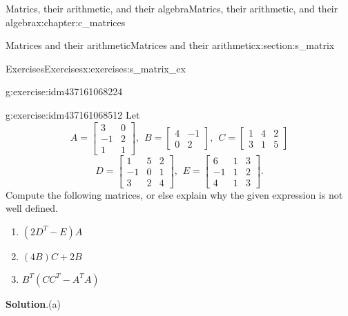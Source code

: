 \documentclass[oneside,10pt,]{book}
\newcommand{\blocktitlefont}{\relax}
\numberwithin{equation}{section}
\newcommand{\amp}{&}
\begin{document}
\begin{chapterptx}{Matrics, their arithmetic, and their algebra}{}{Matrics, their arithmetic, and their algebra}{}{}{x:chapter:c_matrices}
\begin{sectionptx}{Matrices and their arithmetic}{}{Matrices and their arithmetic}{}{}{x:section:s_matrix}
\begin{exercises-subsection-numberless}{Exercises}{}{Exercises}{}{}{x:exercises:s_matrix_ex}
\begin{divisionexercise}{1}{}{}{g:exercise:idm437161068224}
\end{divisionexercise}%
\begin{divisionexercise}{2}{}{}{g:exercise:idm437161068512}%
Let%
\begin{equation*}
A = \begin{bmatrix}3\amp 0\\ -1\amp 2\\ 1\amp 1 \end{bmatrix} , \hspace{5pt} B = \begin{bmatrix}4\amp -1\\ 0\amp 2 \end{bmatrix} , \hspace{5pt} C = \begin{bmatrix}1\amp 4\amp 2\\ 3\amp 1\amp 5 \end{bmatrix}
\end{equation*}
%
\begin{equation*}
D = \begin{bmatrix}1\amp 5\amp 2\\ -1\amp 0\amp 1\\ 3\amp 2\amp 4 \end{bmatrix} ,  \hspace{5pt} E = \begin{bmatrix}6\amp 1\amp 3\\ -1\amp 1\amp 2\\ 4\amp 1\amp 3 \end{bmatrix}\text{.}
\end{equation*}
Compute the following matrices, or else explain why the given expression is not well defined.%
\begin{enumerate}[marker=(\alph*)]
\item{}\(\displaystyle (2D^T-E)A\)%
\item{}\(\displaystyle (4B)C+2B\)%
\item{}\(\displaystyle B^T(CC^T-A^TA)\)%
\end{enumerate}
%
\par\smallskip%
\noindent\textbf{\blocktitlefont Solution}.\hypertarget{g:solution:idm437161058048}{}\quad{}(a)%
\begin{align*}

\end{align*}
\end{divisionexercise}
\end{exercises-subsection-numberless}
\end{sectionptx}
\end{chapterptx}
\end{document}
